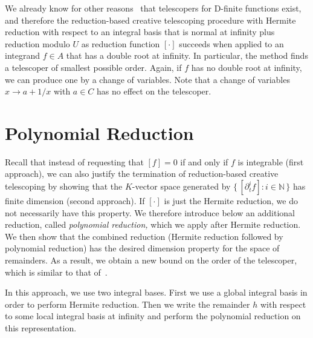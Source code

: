 \documentclass[final,1p,times,authoryear]{elsarticle}
\let\set\mathbb
\begin{document}
We already know for other reasons~\citep{Zeilberger1990,chyzak00} that
telescopers for D-finite functions exist, and therefore the reduction-based
creative telescoping procedure with Hermite reduction with respect to an
integral basis that is normal at infinity plus reduction modulo $U$
as reduction function $[\cdot]$ succeeds when applied to an integrand $f\in A$ that has a double root at infinity.
In particular, the method finds a telescoper of smallest possible order.
Again, if $f$ has no double root at infinity, we can produce one by a change of variables.
Note that a change of variables $x\to a+1/x$ with $a\in C$ has no effect on
the telescoper.

\section{Polynomial Reduction}\label{sec:polynomial}

Recall that instead of requesting that $[f]=0$ if and only if $f$ is integrable
(first approach), we can also justify the termination of reduction-based
creative telescoping by showing that the $K$-vector space generated by $\{\,[\partial_t^if]:i\in\set N\,\}$
has finite dimension (second approach). If $[\cdot]$ is just the Hermite
reduction, we do not necessarily have this property. We therefore introduce below an
additional reduction, called \emph{polynomial reduction,} which we apply after
Hermite reduction. We then show that the combined reduction (Hermite reduction
followed by polynomial reduction) has the desired dimension property for the
space of remainders. As a result, we obtain a new bound on the order of the
telescoper, which is similar to that of~\cite{chen14a}.

In this approach, we use two integral bases. First we use a global integral basis
in order to perform Hermite reduction. Then we write the
remainder $h$ with respect to some local integral basis at infinity and perform the
polynomial reduction on this representation.
\end{document}
